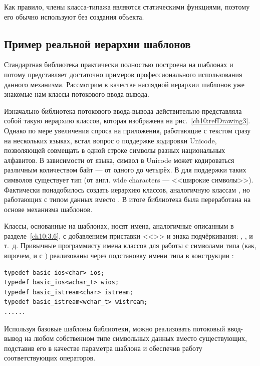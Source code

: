 Как правило, члены класса-типажа являются статическими функциями, поэтому его обычно используют без создания объекта.

\subsection[Пример реальной иерархии шаблонов]{Пример реальной иерархии шаблонов}
Стандартная библиотека  практически полностью построена на шаблонах и потому представляет достаточно примеров
профессионального использования данного механизма.  Рассмотрим в качестве наглядной иерархии шаблонов уже знакомые нам
классы потокового ввода-вывода.

Изначально библиотека потокового ввода-вывода действительно представляла собой такую иерархию классов, которая
изображена на рис.~\ref{ch10:refDrawing3}. Однако по мере увеличения спроса на приложения, работающие с текстом сразу на
нескольких языках, встал вопрос о поддержке кодировки Unicode, позволяющей совмещать в одной строке символы разных
национальных алфавитов. В зависимости от языка, символ в Unicode может кодироваться различным количеством байт --- от
одного до четырёх. В  для поддержки таких символов существует тип  (от англ. wide
characters --- <<широкие символы>>). Фактически понадобилось создать иерархию классов, аналогичную классам 
, но работающих с типом данных  вместо
. В итоге библиотека  была переработана на основе механизма
шаблонов.

Классы, основанные на шаблонах, носят имена, аналогичные описанным в разделе~\ref{ch10:3.6}, с добавлением приставки
<<>> и знака подчёркивания: ,
,   и т.~д. Привычные программисту имена
классов для работы с символами типа  (как, впрочем, и с )
реализованы через подстановку имени типа в конструкции :
\begin{lstlisting}
typedef basic_ios<char> ios;
typedef basic_ios<wchar_t> wios;
typedef basic_istream<char> istream;
typedef basic_istream<wchar_t> wistream;
......
\end{lstlisting}

Используя базовые шаблоны библиотеки, можно реализовать потоковый ввод-вывод на любом собственном типе символьных данных
вместо существующих, подставив его в качестве параметра шаблона и обеспечив работу соответствующих операторов.

